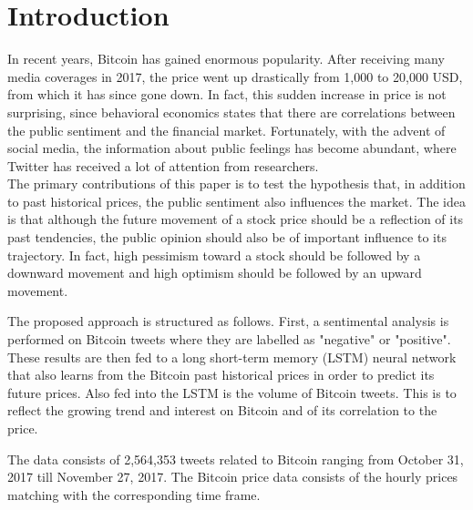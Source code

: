 \documentclass[conference]{IEEEtran}
\begin{document}
\section{Introduction}
\par In recent years, Bitcoin has gained enormous popularity. After receiving many media coverages in 2017, the price went up drastically from 1,000 to 20,000 USD, from which it has since gone down. In fact, this sudden increase in price is not surprising, since behavioral economics states that there are correlations between the public sentiment and the financial market. Fortunately, with the advent of social media, the information about public feelings has become abundant, where Twitter has received a lot of attention from researchers. \\
	The primary contributions of this paper is to test the hypothesis that, in addition to past historical prices, the public sentiment also influences the market. The idea is that although the future movement of a stock price should be a reflection of its past tendencies, the public opinion should also be of important influence to its trajectory. In fact, high pessimism toward a stock should be followed by a downward movement and high optimism should be followed by an upward movement. 
\par The proposed approach is structured as follows. First, a sentimental analysis is  performed on Bitcoin tweets where they are labelled as "negative" or "positive". These results are then fed to a long short-term memory (LSTM) neural network that also learns from the Bitcoin past historical prices in order to predict its future prices. Also fed into the LSTM is the volume of Bitcoin tweets. This is to reflect the growing trend and interest on Bitcoin and of its correlation to the price.
\par	 The data consists of 2,564,353 tweets related to Bitcoin ranging from October 31, 2017 till November 27, 2017.    The Bitcoin price data consists of the hourly prices matching with the corresponding time frame.
	 
\end{document}
